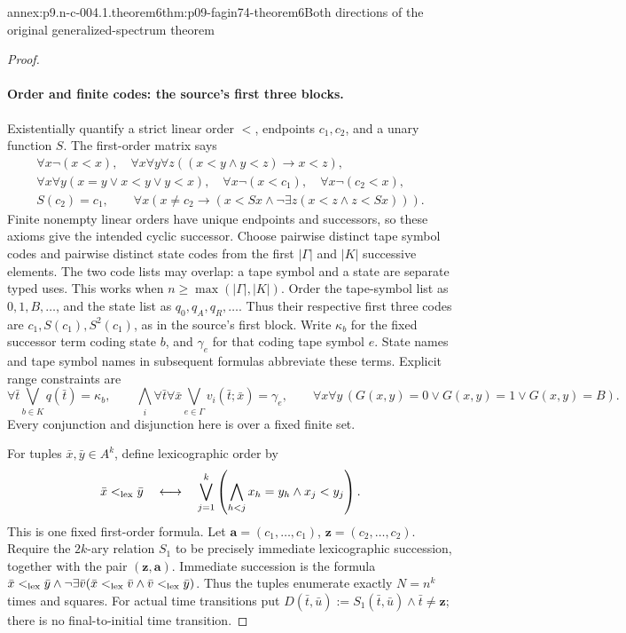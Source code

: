 \begin{annexitem}{annex:p9.n-c-004.1.theorem6}{thm:p09-fagin74-theorem6}{Both directions of the original generalized-spectrum theorem}
\begin{proof}
\paragraph{Order and finite codes: the source's first three blocks.}
Existentially quantify a strict linear order \(<\), endpoints \(c_1,c_2\),
and a unary function \(S\).  The first-order matrix says
\[
 \begin{gathered}
 \forall x\neg(x<x),\quad
 \forall x\forall y\forall z((x<y\land y<z)\to x<z),\\
 \forall x\forall y(x=y\lor x<y\lor y<x),\quad
 \forall x\neg(x<c_1),\quad\forall x\neg(c_2<x),\\
 S(c_2)=c_1,\qquad
 \forall x(x\ne c_2\to
    (x<Sx\land\neg\exists z(x<z\land z<Sx))).
 \end{gathered}
\]
Finite nonempty linear orders have unique endpoints and successors, so these
axioms give the intended cyclic successor.  Choose pairwise distinct tape
symbol codes and pairwise distinct state codes from the first
\(\lvert\Gamma\rvert\) and \(\lvert K\rvert\) successive elements.
The two code lists may overlap: a tape symbol and a state are separate typed
uses.  This works when \(n\geq\max(\lvert\Gamma\rvert,\lvert K\rvert)\).
Order the tape-symbol list as \(0,1,B,\ldots\), and the state list as
\(q_0,q_A,q_R,\ldots\).  Thus their respective first three codes are
\(c_1,S(c_1),S^2(c_1)\), as in the source's first block.
Write \(\kappa_b\) for the fixed successor term coding state \(b\), and
\(\gamma_e\) for that coding tape symbol \(e\).  State names and tape
symbol names in subsequent formulas abbreviate these terms.
Explicit range constraints are
\[
 \forall\bar t\bigvee_{b\in K}q(\bar t)=\kappa_b,\qquad
 \bigwedge_i\forall\bar t\forall\bar x
                \bigvee_{e\in\Gamma}v_i(\bar t;\bar x)=\gamma_e,
 \qquad
 \forall x\forall y\,(G(x,y)=0\lor G(x,y)=1\lor G(x,y)=B).
\]
Every conjunction and disjunction here is over a fixed finite set.

For tuples \(\bar x,\bar y\in A^k\), define lexicographic order by
\[
 \bar x<_{\rm lex}\bar y
 \quad\longleftrightarrow\quad
 \bigvee_{j=1}^{k}
  \left(\bigwedge_{h<j}x_h=y_h\land x_j<y_j\right).
\]
This is one fixed first-order formula.  Let
\(\mathbf a=(c_1,\ldots,c_1)\),
\(\mathbf z=(c_2,\ldots,c_2)\).  Require the \(2k\)-ary relation
\(S_1\) to be precisely immediate lexicographic succession, together with
the pair \((\mathbf z,\mathbf a)\).  Immediate succession is the formula
\(\bar x<_{\rm lex}\bar y\land
 \neg\exists\bar v(\bar x<_{\rm lex}\bar v\land
                       \bar v<_{\rm lex}\bar y)\).
Thus the tuples enumerate exactly \(N=n^k\) times and squares.
For actual time transitions put
\(D(\bar t,\bar u):=S_1(\bar t,\bar u)\land\bar t\ne\mathbf z\);
there is no final-to-initial time transition.


\end{proof}
\end{annexitem}
